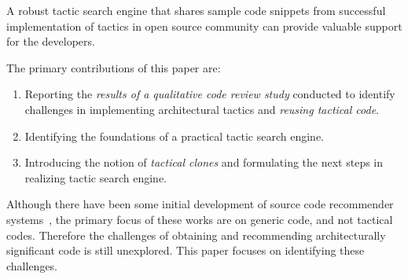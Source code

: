 

A robust tactic  search engine that shares sample code snippets from successful implementation of tactics in open source community can provide valuable support for the developers.



The primary contributions of this paper are: 

\begin{enumerate}
   \setlength{\itemsep}{0pt} %
   \setlength{\parskip}{0pt} %
   \setlength{\parsep}{0pt}  %

  \item Reporting the \textit{results of a qualitative code review study} conducted to identify challenges in implementing architectural tactics and \textit{reusing tactical code}.
  \item Identifying the foundations of a practical tactic search engine.
  \item Introducing the notion of \textit{tactical clones} and formulating the next steps in realizing tactic search engine.
\end{enumerate}



Although there have been some initial development of source code recommender systems~\cite{DBLP:conf/icse/McMillanHPCM12,6340250}, the primary focus of these works are on generic code, and not tactical codes. Therefore the challenges of obtaining and recommending architecturally significant code is still unexplored. This paper focuses on identifying these challenges.

